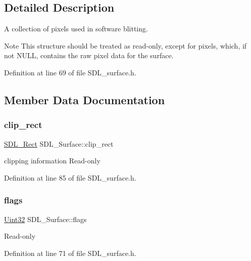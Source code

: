 \subsection{Detailed Description}
A collection of pixels used in software blitting. 

\begin{DoxyNote}{Note}
This structure should be treated as read-\/only, except for {\ttfamily pixels}, which, if not N\+U\+LL, contains the raw pixel data for the surface. 
\end{DoxyNote}


Definition at line 69 of file S\+D\+L\+\_\+surface.\+h.



\subsection{Member Data Documentation}
\mbox{\label{struct_s_d_l___surface_aa9a0da3b38261dad6cf0cc4e3bb5b0c3}} 
\subsubsection{\texorpdfstring{clip\_rect}{clip\_rect}}
{\footnotesize\ttfamily \mbox{\hyperlink{struct_s_d_l___rect}{S\+D\+L\+\_\+\+Rect}} S\+D\+L\+\_\+\+Surface\+::clip\+\_\+rect}

clipping information Read-\/only 

Definition at line 85 of file S\+D\+L\+\_\+surface.\+h.

\mbox{\label{struct_s_d_l___surface_a86d78b665d5dfd7aa1dd9696b067641b}} 
\subsubsection{\texorpdfstring{flags}{flags}}
{\footnotesize\ttfamily \mbox{\hyperlink{_s_d_l__stdinc_8h_add440eff171ea5f55cb00c4a9ab8672d}{Uint32}} S\+D\+L\+\_\+\+Surface\+::flags}

Read-\/only 

Definition at line 71 of file S\+D\+L\+\_\+surface.\+h.

\mbox{\label{struct_s_d_l___surface_a0a90721f947c10c3b79e02ccb419ca62}} 
